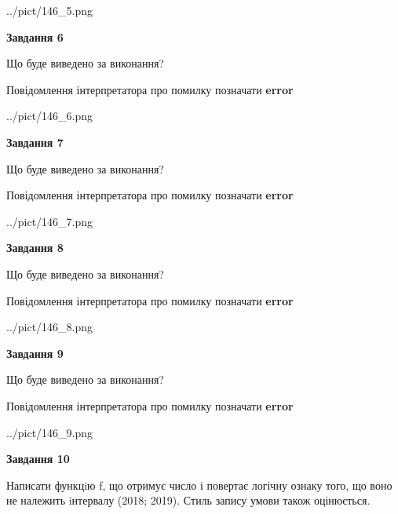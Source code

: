 \documentclass[12pt, ukrainian]{article}
\begin{document}
{\begin {large}
\begin{center}
	{../pict/146_5.png}
\end{center}
\newpage

{\begin {center}\textbf{Завдання 6}\end {center}}\par
Що буде виведено за виконання? \par
Повідомлення інтерпретатора про помилку позначати \textbf{error}

\begin{center}
	{../pict/146_6.png}
\end{center}
\newpage

{\begin {center}\textbf{Завдання 7}\end {center}}\par
Що буде виведено за виконання? \par
Повідомлення інтерпретатора про помилку позначати \textbf{error}

\begin{center}
	{../pict/146_7.png}
\end{center}
\newpage

{\begin {center}\textbf{Завдання 8}\end {center}}\par
Що буде виведено за виконання? \par
Повідомлення інтерпретатора про помилку позначати \textbf{error}

\begin{center}
	{../pict/146_8.png}
\end{center}
\newpage

{\begin {center}\textbf{Завдання 9}\end {center}}\par
Що буде виведено за виконання? \par
Повідомлення інтерпретатора про помилку позначати \textbf{error}

\begin{center}
	{../pict/146_9.png}
\end{center}
\newpage

{\begin {center}\textbf{Завдання 10}\end {center}}\par

Написати функцiю f, що отримує число і повертає логічну ознаку того, що воно не належить iнтервалу (2018; 2019). Стиль запису умови також оцінюється.\par
\newpage

\end {large}}
\end{document}
